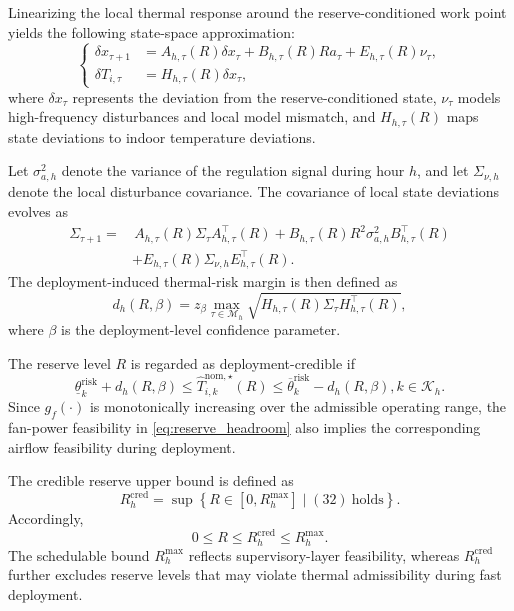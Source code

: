 \documentclass[journal]{IEEEtran}
\theoremstyle{remark}
\begin{document}
Linearizing the local thermal response around the reserve-conditioned work point yields the following state-space approximation:
\begin{equation}
	\left\{
	\begin{aligned}
	\delta x_{\tau+1}
		&=
		A_{h,\tau}(R)\delta x_\tau
		+
		B_{h,\tau}(R)R a_\tau
		+
		E_{h,\tau}(R)\nu_\tau ,
		\label{eq:local_state}
		\\
		\delta T_{i,\tau}
		&=
		H_{h,\tau}(R)\delta x_\tau ,
	\end{aligned}
	\right.
\end{equation}
where \(\delta x_\tau\) represents the deviation from the reserve-conditioned state, \(\nu_\tau\) models high-frequency disturbances and local model mismatch, and \(H_{h,\tau}(R)\) maps state deviations to indoor temperature deviations.

Let $\sigma_{a,h}^2$ denote the variance of the regulation
signal during hour $h$, and let $\Sigma_{\nu,h}$ denote the
local disturbance covariance. The covariance of local state
deviations evolves as
\begin{align}
	\Sigma_{\tau+1}
	=&\,
	A_{h,\tau}(R)\Sigma_\tau A_{h,\tau}^{\top}(R)
	+
	B_{h,\tau}(R)R^2\sigma_{a,h}^2 B_{h,\tau}^{\top}(R)
	\nonumber\\
	&+
	E_{h,\tau}(R)\Sigma_{\nu,h}E_{h,\tau}^{\top}(R).
	\label{eq:covariance_prop}
\end{align}
The deployment-induced thermal-risk margin is then defined as
\begin{equation}
	d_h(R,\beta)
	=
	z_{\beta}
	\max_{\tau\in\mathcal{M}_h}
	\sqrt{
		H_{h,\tau}(R)\Sigma_\tau H_{h,\tau}^{\top}(R)
	},
	\label{eq:deployment_margin}
\end{equation}
where $\beta$ is the deployment-level confidence parameter.

The reserve level $R$ is regarded as deployment-credible if
\begin{equation}
	\underline{\theta}_{k}^{\mathrm{risk}}
	+
	d_h(R,\beta)
	\le
	\hat T_{i,k}^{\mathrm{nom},\star}(R)
	\le
	\overline{\theta}_{k}^{\mathrm{risk}}
	-
	d_h(R,\beta),
	k\in\mathcal{K}_h .
	\label{eq:credible_condition}
\end{equation}
Since \(g_f(\cdot)\) is monotonically increasing over the admissible operating range, the fan-power feasibility in \eqref{eq:reserve_headroom} also implies the corresponding airflow feasibility during deployment.

The credible reserve upper bound is defined as
\begin{equation}
    R_h^{\mathrm{cred}}
    =
    \sup
    \left\{
    R \in [0,R_h^{\max}] \mid (32)\ \text{holds}
    \right\}.
	\label{eq:credible_reserve}
\end{equation}
Accordingly,
\begin{equation}
	0
	\le
	R
	\le
	R_h^{\mathrm{cred}}
	\le
	R_h^{\mathrm{max}} .
	\label{eq:reserve_hierarchy}
\end{equation}
The schedulable bound $R_h^{\mathrm{max}}$ reflects
supervisory-layer feasibility, whereas $R_h^{\mathrm{cred}}$
further excludes reserve levels that may violate thermal
admissibility during fast deployment.
\end{document}
